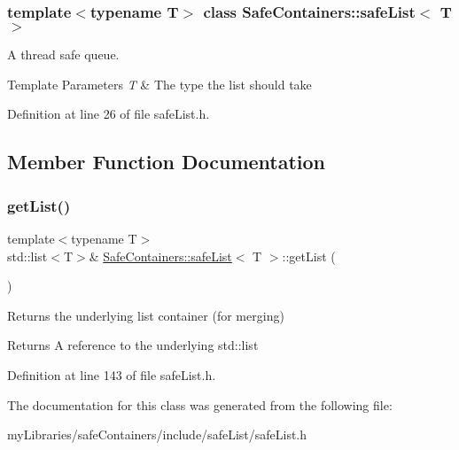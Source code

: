 \subsubsection*{template$<$typename T$>$\newline
class Safe\+Containers\+::safe\+List$<$ T $>$}

A thread safe queue. 


\begin{DoxyTemplParams}{Template Parameters}
{\em T} & The type the list should take \\
\hline
\end{DoxyTemplParams}


Definition at line 26 of file safe\+List.\+h.



\subsection{Member Function Documentation}
\mbox{\label{classSafeContainers_1_1safeList_ad4fa563a40289125869321d85312f24d}} 
\subsubsection{\texorpdfstring{getList()}{getList()}}
{\footnotesize\ttfamily template$<$typename T$>$ \\
std\+::list$<$T$>$\& \mbox{\hyperlink{classSafeContainers_1_1safeList}{Safe\+Containers\+::safe\+List}}$<$ T $>$\+::get\+List (\begin{DoxyParamCaption}{ }\end{DoxyParamCaption})\hspace{0.3cm}{\ttfamily [inline]}}



Returns the underlying list container (for merging) 

\begin{DoxyReturn}{Returns}
A reference to the underlying std\+::list 
\end{DoxyReturn}


Definition at line 143 of file safe\+List.\+h.



The documentation for this class was generated from the following file\+:\begin{DoxyCompactItemize}
\item 
my\+Libraries/safe\+Containers/include/safe\+List/safe\+List.\+h\end{DoxyCompactItemize}
